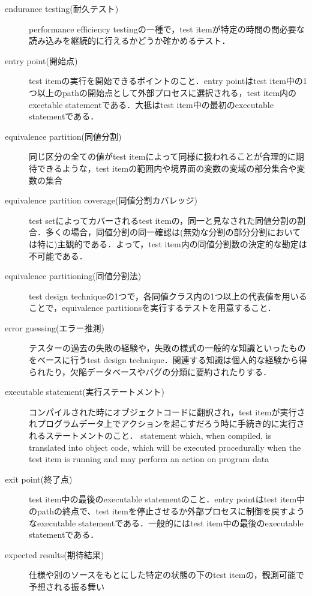 \begin{description}
    \item[endurance testing(耐久テスト)]performance efficiency testingの一種で，test itemが特定の時間の間必要な読み込みを継続的に行えるかどうか確かめるテスト．
    \item[entry point(開始点)]test itemの実行を開始できるポイントのこと．entry pointはtest item中の1つ以上のpathの開始点として外部プロセスに選択される，test item内のexectable statementである．大抵はtest item中の最初のexecutable statementである．
    \item[equivalence partition(同値分割)]同じ区分の全ての値がtest itemによって同様に扱われることが合理的に期待できるような，test itemの範囲内や境界面の変数の変域の部分集合や変数の集合
    \item[equivalence partition coverage(同値分割カバレッジ)]test setによってカバーされるtest itemの，同一と見なされた同値分割の割合．多くの場合，同値分割の同一確認は(無効な分割の部分分割においては特に)主観的である．よって，test item内の同値分割数の決定的な勘定は不可能である．
    \item[equivalence partitioning(同値分割法)]test design techniqueの1つで，各同値クラス内の1つ以上の代表値を用いることで，equivalence partitionsを実行するテストを用意すること．
    \item[error guessing(エラー推測)]テスターの過去の失敗の経験や，失敗の様式の一般的な知識といったものをベースに行うtest design technique．関連する知識は個人的な経験から得られたり，欠陥データベースやバグの分類に要約されたりする．
    \item[executable statement(実行ステートメント)]コンパイルされた時にオブジェクトコードに翻訳され，test itemが実行されプログラムデータ上でアクションを起こすだろう時に手続き的に実行されるステートメントのこと．
        statement which, when compiled, is translated into object code, which will be executed procedurally when the test item is running and may perform an action on program data
    \item[exit point(終了点)]test item中の最後のexecutable statementのこと．entry pointはtest item中のpathの終点で、test itemを停止させるか外部プロセスに制御を戻すようなexecutable statementである．一般的にはtest item中の最後のexecutable statementである．
    \item[expected results(期待結果)]仕様や別のソースをもとにした特定の状態の下のtest itemの，観測可能で予想される振る舞い

\end{description}
